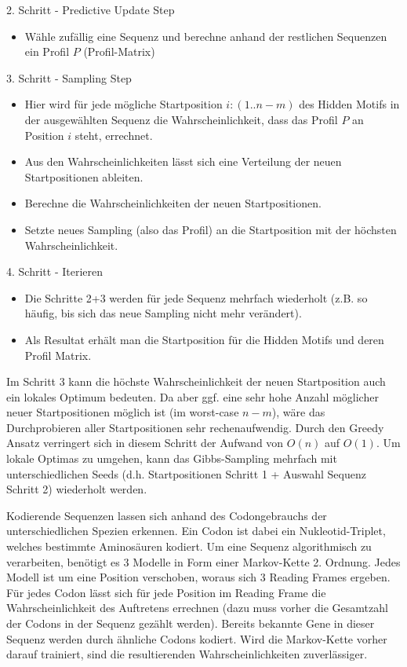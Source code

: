 \documentclass{homework}
\begin{document}
\begin{enumerate}
2. Schritt - Predictive Update Step
\begin{itemize}
	\item Wähle zufällig eine Sequenz und berechne anhand der restlichen Sequenzen ein Profil $P$ (Profil-Matrix)
\end{itemize}

3. Schritt - Sampling Step
\begin{itemize}
	\item Hier wird für jede mögliche Startposition $i:(1..n-m)$ des Hidden Motifs in der ausgewählten Sequenz die Wahrscheinlichkeit, dass das Profil $P$ an Position $i$ steht, errechnet.
	\item Aus den Wahrscheinlichkeiten lässt sich eine Verteilung der neuen Startpositionen ableiten.
	\item Berechne die Wahrscheinlichkeiten der neuen Startpositionen.
	\item Setzte neues Sampling (also das Profil) an die Startposition mit der höchsten Wahrscheinlichkeit.
\end{itemize}

4. Schritt - Iterieren
\begin{itemize}
	\item Die Schritte 2+3 werden für jede Sequenz mehrfach wiederholt (z.B. so häufig, bis sich das neue Sampling nicht mehr verändert).
	\item Als Resultat erhält man die Startposition für die Hidden Motifs und deren Profil Matrix.
\end{itemize}

Im Schritt 3 kann die höchste Wahrscheinlichkeit der neuen Startposition auch ein lokales Optimum bedeuten.
Da aber ggf. eine sehr hohe Anzahl möglicher neuer Startpositionen möglich ist (im worst-case $n-m$),
wäre das Durchprobieren aller Startpositionen sehr rechenaufwendig.
Durch den Greedy Ansatz verringert sich in diesem Schritt der Aufwand von $O(n)$ auf $O(1)$.
Um lokale Optimas zu umgehen, kann das Gibbs-Sampling mehrfach mit unterschiedlichen Seeds (d.h. Startpositionen Schritt 1 + Auswahl Sequenz Schritt 2) wiederholt werden. 


Kodierende Sequenzen lassen sich anhand des Codongebrauchs der unterschiedlichen Spezien erkennen.
Ein Codon ist dabei ein Nukleotid-Triplet, welches bestimmte Aminosäuren kodiert.
Um eine Sequenz algorithmisch zu verarbeiten, benötigt es 3 Modelle in Form einer Markov-Kette 2. Ordnung.
Jedes Modell ist um eine Position verschoben, woraus sich 3 Reading Frames ergeben.
Für jedes Codon lässt sich für jede Position im Reading Frame die Wahrscheinlichkeit des Auftretens errechnen (dazu muss vorher die Gesamtzahl der Codons in der Sequenz gezählt werden).
Bereits bekannte Gene in dieser Sequenz werden durch ähnliche Codons kodiert.
Wird die Markov-Kette vorher darauf trainiert, sind die resultierenden Wahrscheinlichkeiten zuverlässiger.


\end{enumerate}
\end{document}
